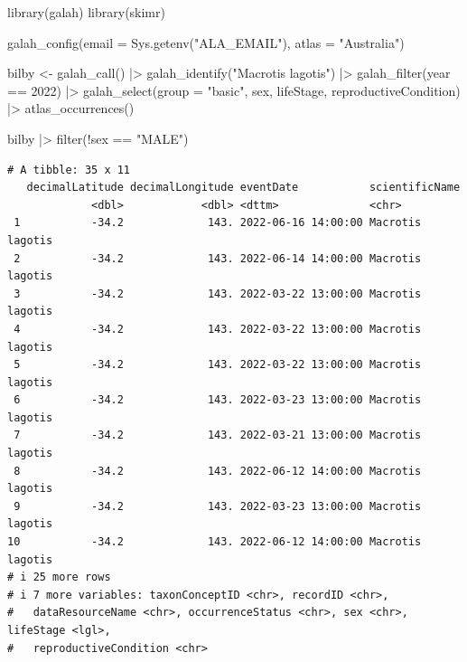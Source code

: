 \documentclass[
  letterpaper,
  DIV=11,
  numbers=noendperiod,
  oneside]{scrreprt}
\newenvironment{Shaded}{\begin{snugshade}}{\end{snugshade}}
\newcommand{\AttributeTok}[1]{\textcolor[rgb]{0.40,0.45,0.13}{#1}}
\newcommand{\DecValTok}[1]{\textcolor[rgb]{0.68,0.00,0.00}{#1}}
\newcommand{\FunctionTok}[1]{\textcolor[rgb]{0.28,0.35,0.67}{#1}}
\newcommand{\NormalTok}[1]{\textcolor[rgb]{0.00,0.23,0.31}{#1}}
\newcommand{\OtherTok}[1]{\textcolor[rgb]{0.00,0.23,0.31}{#1}}
\newcommand{\SpecialCharTok}[1]{\textcolor[rgb]{0.37,0.37,0.37}{#1}}
\newcommand{\StringTok}[1]{\textcolor[rgb]{0.13,0.47,0.30}{#1}}
\begin{document}
\begin{Shaded}
\begin{Highlighting}[]
\FunctionTok{library}\NormalTok{(galah)}
\FunctionTok{library}\NormalTok{(skimr)}

\FunctionTok{galah\_config}\NormalTok{(}\AttributeTok{email =} \FunctionTok{Sys.getenv}\NormalTok{(}\StringTok{"ALA\_EMAIL"}\NormalTok{),}
             \AttributeTok{atlas =} \StringTok{"Australia"}\NormalTok{)}

\NormalTok{bilby }\OtherTok{\textless{}{-}} \FunctionTok{galah\_call}\NormalTok{() }\SpecialCharTok{|\textgreater{}} 
  \FunctionTok{galah\_identify}\NormalTok{(}\StringTok{"Macrotis lagotis"}\NormalTok{) }\SpecialCharTok{|\textgreater{}} 
  \FunctionTok{galah\_filter}\NormalTok{(year }\SpecialCharTok{==} \DecValTok{2022}\NormalTok{) }\SpecialCharTok{|\textgreater{}} 
  \FunctionTok{galah\_select}\NormalTok{(}\AttributeTok{group =} \StringTok{"basic"}\NormalTok{, sex, lifeStage, reproductiveCondition) }\SpecialCharTok{|\textgreater{}} 
  \FunctionTok{atlas\_occurrences}\NormalTok{()}

\NormalTok{bilby }\SpecialCharTok{|\textgreater{}} \FunctionTok{filter}\NormalTok{(}\SpecialCharTok{!}\NormalTok{sex }\SpecialCharTok{==} \StringTok{"MALE"}\NormalTok{)}
\end{Highlighting}
\end{Shaded}

\begin{verbatim}
# A tibble: 35 x 11
   decimalLatitude decimalLongitude eventDate           scientificName  
             <dbl>            <dbl> <dttm>              <chr>           
 1           -34.2             143. 2022-06-16 14:00:00 Macrotis lagotis
 2           -34.2             143. 2022-06-14 14:00:00 Macrotis lagotis
 3           -34.2             143. 2022-03-22 13:00:00 Macrotis lagotis
 4           -34.2             143. 2022-03-22 13:00:00 Macrotis lagotis
 5           -34.2             143. 2022-03-22 13:00:00 Macrotis lagotis
 6           -34.2             143. 2022-03-23 13:00:00 Macrotis lagotis
 7           -34.2             143. 2022-03-21 13:00:00 Macrotis lagotis
 8           -34.2             143. 2022-06-12 14:00:00 Macrotis lagotis
 9           -34.2             143. 2022-03-23 13:00:00 Macrotis lagotis
10           -34.2             143. 2022-06-12 14:00:00 Macrotis lagotis
# i 25 more rows
# i 7 more variables: taxonConceptID <chr>, recordID <chr>,
#   dataResourceName <chr>, occurrenceStatus <chr>, sex <chr>, lifeStage <lgl>,
#   reproductiveCondition <chr>
\end{verbatim}
\end{document}
